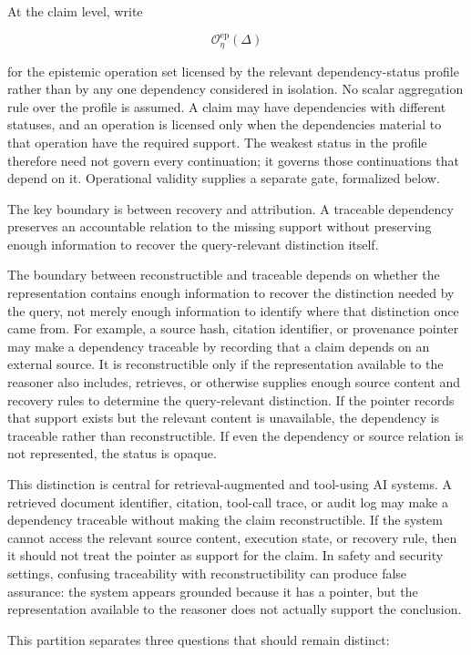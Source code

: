\documentclass[11pt]{article}
\theoremstyle{definition}
\theoremstyle{remark}
\begin{document}
At the claim level, write

\[
\mathcal{O}^{\mathrm{ep}}_{\eta}(\Delta)
\]

for the epistemic operation set licensed by the relevant dependency-status profile rather than by any one dependency considered in isolation. No scalar aggregation rule over the profile is assumed. A claim may have dependencies with different statuses, and an operation is licensed only when the dependencies material to that operation have the required support. The weakest status in the profile therefore need not govern every continuation; it governs those continuations that depend on it. Operational validity supplies a separate gate, formalized below.

The key boundary is between recovery and attribution. A traceable dependency preserves an accountable relation to the missing support without preserving enough information to recover the query-relevant distinction itself.

The boundary between reconstructible and traceable depends on whether the representation contains enough information to recover the distinction needed by the query, not merely enough information to identify where that distinction once came from. For example, a source hash, citation identifier, or provenance pointer may make a dependency traceable by recording that a claim depends on an external source. It is reconstructible only if the representation available to the reasoner also includes, retrieves, or otherwise supplies enough source content and recovery rules to determine the query-relevant distinction. If the pointer records that support exists but the relevant content is unavailable, the dependency is traceable rather than reconstructible. If even the dependency or source relation is not represented, the status is opaque.

This distinction is central for retrieval-augmented and tool-using AI systems. A retrieved document identifier, citation, tool-call trace, or audit log may make a dependency traceable without making the claim reconstructible. If the system cannot access the relevant source content, execution state, or recovery rule, then it should not treat the pointer as support for the claim. In safety and security settings, confusing traceability with reconstructibility can produce false assurance: the system appears grounded because it has a pointer, but the representation available to the reasoner does not actually support the conclusion.

This partition separates three questions that should remain distinct:
\end{document}
